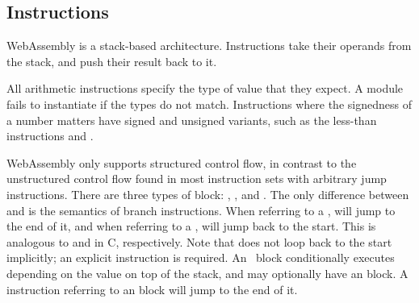 \documentclass[00-main.tex]{subfiles}
\begin{document}
\subsection{Instructions}

WebAssembly is a stack-based architecture.
Instructions take their operands from the stack, and push their result back to it.


All arithmetic instructions specify the type of value that they expect.
A module fails to instantiate if the types do not match.
Instructions where the signedness of a number matters have signed and unsigned variants, such as the less-than instructions  and .

WebAssembly only supports structured control flow, in contrast to the unstructured control flow found in most instruction sets with arbitrary jump instructions.
There are three types of block: , , and .
The only difference between  and  is the semantics of branch instructions.
When referring to a ,  will jump to the end of it, and when referring to a ,  will jump back to the start.
This is analogous to  and  in C, respectively.
Note that  does not loop back to the start implicitly; an explicit  instruction is required.
An ~block conditionally executes depending on the value on top of the stack, and may optionally have an  block.
A  instruction referring to an  block will jump to the end of it.
\end{document}
